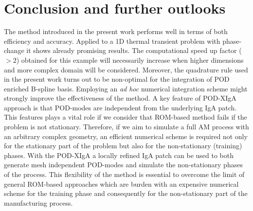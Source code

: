 \documentclass[3p]{article}
\begin{document}
\section*{Conclusion and further outlooks}
The method introduced in the present work performs well in terms of both efficiency and accuracy. Applied to a 1D thermal transient problem with phase-change it shows already promising results. The computational speed up factor ($>2$) obtained for this example will necessarily increase when higher dimensions and more complex domain will be considered. Moreover, the quadrature rule used in the present work turns out to be non-optimal for the integration of POD enriched B-spline basis. Employing an \textit{ad hoc} numerical integration scheme might strongly improve the effectiveness of the method. A key feature of POD-XIgA approach is that POD-modes are independent from the underlying IgA patch. This features plays a vital role if we consider that ROM-based method fails if the problem is not stationary. Therefore, if we aim to simulate a full AM process with an arbitrary complex geometry, an efficient numerical scheme is required not only for the stationary part of the problem but also for the non-stationary (training) phases. With the POD-XIgA a locally refined IgA patch can be used to both generate mesh independent POD-modes and simulate the non-stationary phases of the process. This flexibility of the method is essential to overcome the limit of general ROM-based approaches which are burden with an expensive numerical scheme for the training phase and consequently for the non-stationary part of the manufacturing process.



\end{document}
